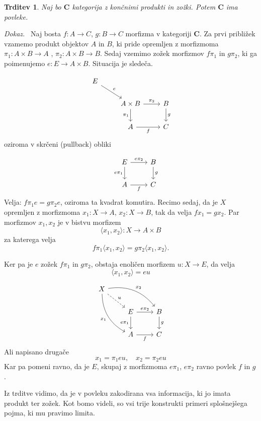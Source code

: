 \documentclass[12pt,a4paper]{book}
\theoremstyle{definition}
\theoremstyle{plain}
\newtheorem{trditev}[definicija]{Trditev}
\newenvironment{dokaz}{\emph{Dokaz.}\ }{\hspace{\fill}{$\Box$}}
\theoremstyle{definition}
\theoremstyle{remark}
\newcommand{\cat}[1]{\textbf{#1}}
\newcommand{\fprod}[1]{\langle #1 \rangle}
\begin{document}
\begin{trditev}
Naj bo $\cat{C}$ kategorija z končnimi produkti in zožki. Potem $\cat{C}$ ima povleke.
\end{trditev}
\begin{dokaz}
Naj bosta $f : A \to C$, $g : B \to C$ morfizma v kategoriji $\cat{C}$. Za prvi približek vzamemo produkt objektov $A$ in $B$, ki pride opremljen z morfizmoma $\pi_1 : A \times B \to A$ , $\pi_2 : A \times B \to B$. Sedaj vzemimo zožek morfizmov $f\pi_1$ in $g\pi_2$, ki ga poimenujemo $e : E \to A \times B$. Situacija je sledeča.

$$\begin{tikzcd}
E
\ar[dr, "e"] \\
& A \times B \arrow[r, "\pi_2"] \arrow[d, "\pi_1"']
& B \arrow[d, "g"] \\
& A \arrow[r, "f"']
& C
\end{tikzcd}$$
oziroma v skrčeni (pullback) obliki

$$\begin{tikzcd}
& E \arrow[r, "e\pi_2"] \arrow[d, "e\pi_1"']
& B \arrow[d, "g"] \\
& A \arrow[r, "f"']
& C
\end{tikzcd}$$
Velja: $f\pi_1e = g\pi_2e$, oziroma ta kvadrat komutira. Recimo sedaj, da je $X$ opremljen z morfizmoma $x_1 : X \to A$, $x_2 : X \to B$, tak da velja $fx_1 = gx_2$. Par morfizmov $x_1,x_2$ je v bistvu morfizem 
$$\langle x_1,x_2 \rangle : X \to A \times B$$
za katerega velja
$$f\pi_1\fprod{x_1,x_2} = g\pi_2\fprod{x_1,x_2}.$$

Ker pa je $e$ zožek $f\pi_1$ in $g\pi_2$, obstaja enoličen morfizem $u : X \to E$, da velja 
$$\fprod{x_1,x_2} = eu$$

$$\begin{tikzcd}
X \ar[ddr, bend right, "x_1"'] \ar[drr, bend left, "x_2"] \ar[dr, dashed, "u"] \\
& E \arrow[r, "e\pi_2"] \arrow[d, "e\pi_1"']
& B \arrow[d, "g"] \\
& A \arrow[r, "f"']
& C
\end{tikzcd}$$
%
Ali napisano drugače
$$x_1 = \pi_1eu, \quad x_2 = \pi_2eu$$
Kar pa pomeni ravno, da je $E$, skupaj z morfizmoma $e\pi_1$, $e\pi_2$ ravno povlek $f$ in $g$.
\end{dokaz}

Iz trditve vidimo, da je v povleku zakodirana vsa informacija, ki jo imata produkt ter zožek. Kot bomo videli, so vsi trije konstrukti primeri splošnejšega pojma, ki mu pravimo limita.
\end{document}
